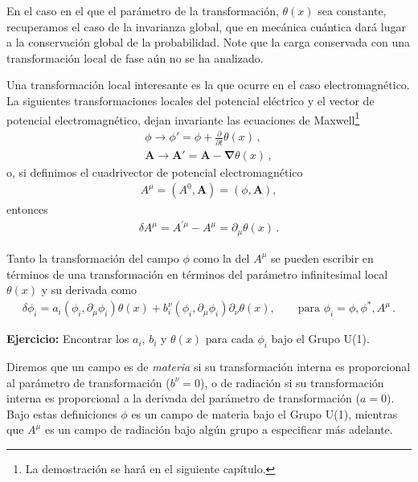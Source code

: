 En el caso en el que el parámetro de la transformación, $\theta(x)$ sea constante, recuperamos el caso de la invarianza global, que en mecánica cuántica dará lugar a la conservación global de la probabilidad. Note que la carga conservada con una transformación local de fase aún no se ha analizado.

Una transformación local interesante es la que ocurre en el caso electromagnético. La siguientes transformaciones locales del potencial eléctrico y el vector de potencial electromagnético, dejan invariante las ecuaciones de Maxwell\footnote{La demostración se hará en el siguiente capítulo.}
\begin{align}
  \phi \to \phi'=\phi+\frac{\partial}{\partial t}\theta(x)\,,\nonumber\\
  \mathbf{A} \to \mathbf{A}'=\mathbf{A}- \boldsymbol{\nabla}\theta(x)\,,
\end{align}
o, si definimos el cuadrivector de potencial electromagnético
\begin{align}
  A^{\mu}=(A^0,\mathbf{A})=(\phi,\mathbf{A}),
\end{align}
entonces %
\begin{align}
  \delta A^{\mu}=A^{\prime\mu}-A^{\mu}=\partial_\mu \theta(x)\,.
\end{align}


Tanto la transformación del campo $\phi$ como la del $A^{\mu}$ se pueden escribir en términos de una transformación en términos del parámetro infinitesimal local $\theta(x)$ y su derivada como
\begin{align}
\label{eq:dfi}
  \delta\phi_i= a_{i}\left( \phi_{i},\partial_{\mu}\phi_{i} \right) \theta(x)+b^{\nu}_i \left( \phi_{i},\partial_{\mu}\phi_{i} \right) \partial_{\nu}\theta(x),\qquad \text{para $\phi_{i}=\phi,\phi^{*},A^{\mu}$}\,.
\end{align}

\textbf{Ejercicio:} Encontrar los $a_i$, $b_i$ y  $\theta(x)$ para cada $\phi_i$ bajo el Grupo U(1).

Diremos que un campo es de \emph{materia} si su transformación interna es proporcional al parámetro de transformación ($b^{\nu}=0$), o de radiación si su transformación interna es proporcional a la derivada del parámetro de transformación ($a=0$). Bajo estas definiciones $\phi$ es un campo de materia bajo el Grupo U(1), mientras que $A^{\mu}$ es un campo de radiación bajo algún grupo a especificar más adelante. 

